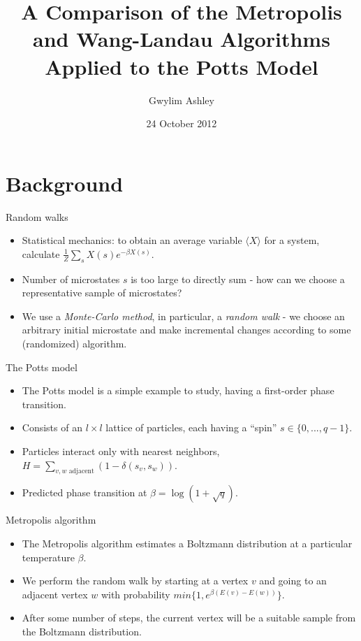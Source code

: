 \documentclass{beamer}
\title[Metropolis and Wang-Landau algorithms]{A Comparison of the Metropolis and Wang-Landau Algorithms Applied to the Potts Model}
\author{Gwylim Ashley}
\date{24 October 2012}
\begin{document}
\begin{frame}
  \titlepage
\end{frame}

\section{Background}
\begin{frame}{Random walks}
    \begin{itemize}
        \item Statistical mechanics: to obtain an average variable $\langle X\rangle$ for a system, calculate $\frac{1}{Z}\sum_s X(s)e^{-\beta X(s)}$.
        \item Number of microstates $s$ is too large to directly sum - how can we choose a representative sample of microstates?
        \item We use a \emph{Monte-Carlo method}, in particular, a \emph{random walk} - we choose an arbitrary initial microstate and make incremental changes according to some (randomized) algorithm.
    \end{itemize}
\end{frame}
\begin{frame}{The Potts model}
    \begin{itemize}
        \item The Potts model is a simple example to study, having a first-order phase transition.
        \item Consists of an $l\times l$ lattice of particles, each having a ``spin'' $s \in \{0,...,q-1\}$.
        \item Particles interact only with nearest neighbors, $H = \sum_{v, w\text{ adjacent}}(1 - \delta(s_v, s_w))$.
        \item Predicted phase transition at $\beta = \log(1 + \sqrt q)$.
    \end{itemize}
\end{frame}
\begin{frame}{Metropolis algorithm}
    \begin{itemize}
        \item The Metropolis algorithm estimates a Boltzmann distribution at a particular temperature $\beta$.
        \item We perform the random walk by starting at a vertex $v$ and going to an adjacent vertex $w$ with probability $min\{1, e^{\beta(E(v) - E(w))}\}$.
        \item After some number of steps, the current vertex will be a suitable sample from the Boltzmann distribution.
    \end{itemize}
\end{frame}
\end{document}
